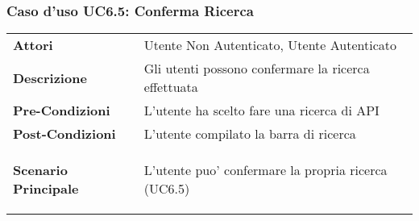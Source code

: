 \subsubsection{Caso d'uso UC6.5:  Conferma Ricerca}
\label{UC6_5}

\begin{tabular}{ l | p{11cm}}
	\hline
	\rowcolor{Gray}
	 \multicolumn{2}{c}{UC6.5 - Conferma Ricerca} \\
	 \hline
	\textbf{Attori} & Utente Non Autenticato, Utente Autenticato \\
	\textbf{Descrizione} & Gli utenti possono confermare la ricerca effettuata\\
	\textbf{Pre-Condizioni} & L'utente ha scelto fare una ricerca di API\\
	\textbf{Post-Condizioni} & L'utente compilato la barra di ricerca \\
	\textbf{Scenario Principale} & 
	\begin{enumerate*}[label=(\arabic*.),itemjoin={\newline}]
		\item L'utente puo' confermare la propria ricerca (UC6.5)
	\end{enumerate*}\\
\end{tabular}